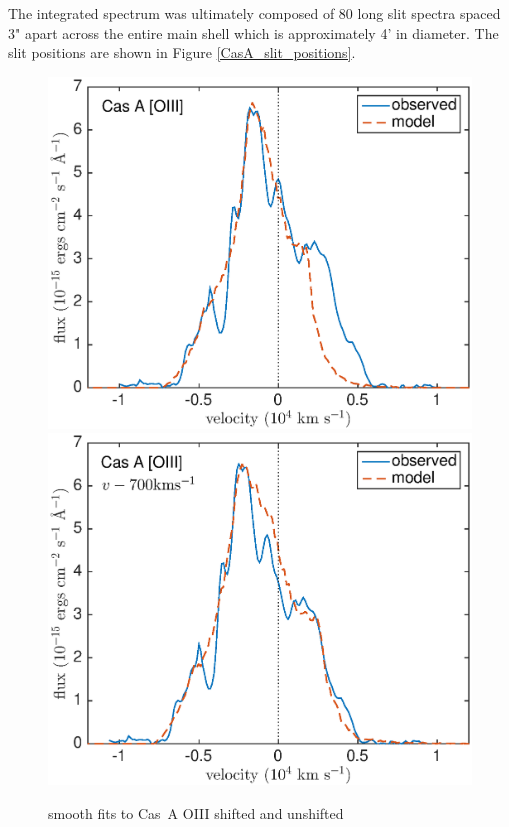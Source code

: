 The integrated spectrum was ultimately composed of 80 long slit spectra spaced 3" apart across the entire main shell which is approximately 4' in diameter.  The slit positions are shown in Figure \ref{CasA_slit_positions}.





\begin{figure}
\centering
\includegraphics[scale=0.43,clip=true, trim=30 0 50 20]{chapters/chapter6/figs/CasA/CasA_OIII}
\includegraphics[scale=0.43,clip=true, trim=30 0 50 20]{chapters/chapter6/figs/CasA/CasA_shifted_OIII}
\caption{smooth fits to Cas~A OIII shifted and unshifted}
\label{CasA_OIII}
\end{figure}


